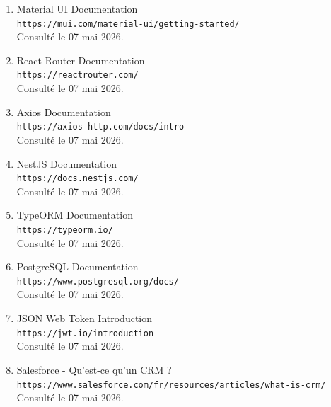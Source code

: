 \documentclass[12pt,a4paper]{report}
\begin{document}
\begin{enumerate}
    \item Material UI Documentation \\
    \texttt{https://mui.com/material-ui/getting-started/} \\
    Consulté le 07 mai 2026.

    \item React Router Documentation \\
    \texttt{https://reactrouter.com/} \\
    Consulté le 07 mai 2026.

    \item Axios Documentation \\
    \texttt{https://axios-http.com/docs/intro} \\
    Consulté le 07 mai 2026.

    \item NestJS Documentation \\
    \texttt{https://docs.nestjs.com/} \\
    Consulté le 07 mai 2026.

    \item TypeORM Documentation \\
    \texttt{https://typeorm.io/} \\
    Consulté le 07 mai 2026.

    \item PostgreSQL Documentation \\
    \texttt{https://www.postgresql.org/docs/} \\
    Consulté le 07 mai 2026.

    \item JSON Web Token Introduction \\
    \texttt{https://jwt.io/introduction} \\
    Consulté le 07 mai 2026.

    \item Salesforce - Qu'est-ce qu'un CRM ? \\
    \texttt{https://www.salesforce.com/fr/resources/articles/what-is-crm/} \\
    Consulté le 07 mai 2026.
\end{enumerate}
\end{document}
